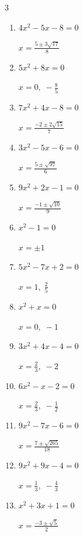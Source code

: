 \begin{multicols}{3}
\begin{enumerate}
  \item $4x^{2}-5x-8=0$

        $\displaystyle x=\frac{5\pm 3\sqrt{17}}{8}$

  \item $5x^{2}+8x=0$

        $\displaystyle x=0, \; -\frac{8}{5}$

  \item $7x^{2}+4x-8=0$

        $\displaystyle x=\frac{-2\pm 2\sqrt{15}}{7}$

  \item $3x^{2}-5x-6=0$

        $\displaystyle x=\frac{5\pm \sqrt{97}}{6}$

  \item $9x^{2}+2x-1=0$

        $\displaystyle x=\frac{-1\pm \sqrt{10}}{9}$

\columnbreak %

  \item $x^{2}-1=0$

        $\displaystyle x=\pm 1$

  \item $5x^{2}-7x+2=0$

        $\displaystyle x=1, \; \frac{2}{5}$

  \item $x^{2}+x=0$

        $\displaystyle x=0, \; -1$

  \item $3x^{2}+4x-4=0$

        $\displaystyle x=\frac{2}{3}, \; -2$

  \item $6x^{2}-x-2=0$

        $\displaystyle x=\frac{2}{3}, \; -\frac{1}{2}$

  \item $9x^{2}-7x-6=0$

        $\displaystyle x=\frac{7\pm \sqrt{265}}{18}$

  \item $9x^{2}+9x-4=0$

        $\displaystyle x=\frac{1}{3}, \; -\frac{4}{3}$

\columnbreak %

  \item $x^{2}+3x+1=0$

        $\displaystyle x=\frac{-3\pm \sqrt{5}}{2}$


\end{enumerate}
\end{multicols}
